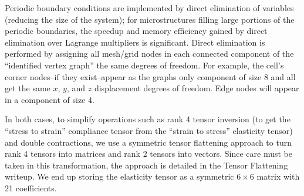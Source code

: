 \documentclass[10pt]{article}
\begin{document}
Periodic boundary conditions are implemented by direct elimination of
variables (reducing the size of the system); for microstructures filling large
portions of the periodic boundaries, the speedup and memory efficiency gained
by direct elimination over Lagrange multipliers is significant.
Direct elimination is performed by
assigning all mesh/grid nodes in each connected component of the ``identified
vertex graph'' the same degrees of freedom. For example, the cell's corner
nodes--if they exist--appear as the graphs only component of size 8 and all get
the same $x$, $y$, and $z$ displacement degrees of freedom. Edge nodes will
appear in a component of size 4.

In both cases, to simplify operations such as rank 4 tensor inversion (to get
the ``stress to strain'' compliance tensor from the ``strain to stress'' elasticity
tensor) and double contractions, we use a symmetric tensor flattening approach
to turn rank 4 tensors into matrices and rank 2 tensors into vectors. Since
care must be taken in this transformation, the approach is detailed in the
Tensor Flattening writeup. We end up storing the elasticity tensor as a
symmetric $6\times 6$ matrix with 21 coefficients.



\end{document}
